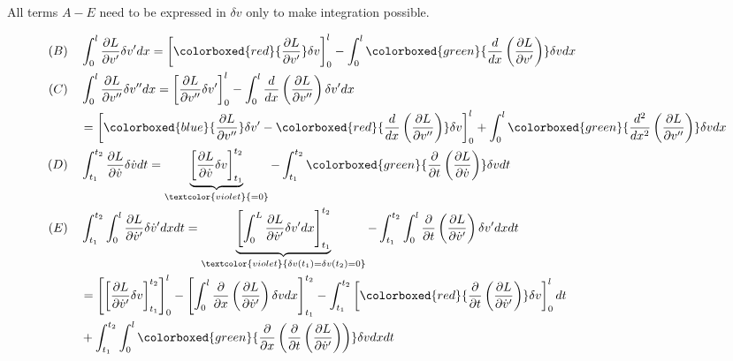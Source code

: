 \documentclass[10pt,a4paper]{scrartcl}
\begin{document}
\begin{multicols*}{2}
All terms $A-E$ need to be expressed in $\delta v$ only to make integration possible.

\begin{align*}
(B)\quad&\int_0^l\frac{\partial L}{\partial v'}\delta v' dx = \left[\colorboxed{red}{\frac{\partial L}{\partial v'}}\delta v\right]_0^l-\int_0^l\colorboxed{green}{\frac{d}{dx}\left(\frac{\partial L}{\partial v'}\right)}\delta v dx\\
(C)\quad&\int_0^l\frac{\partial L}{\partial v''}\delta v''dx = \left[\frac{\partial L}{\partial v''}\delta v'\right]_0^l-\int_0^l\frac{d}{dx}\left(\frac{\partial L}{\partial v''}\right)\delta v' dx\\
&=\left[\colorboxed{blue}{\frac{\partial L}{\partial v''}}\delta v'-\colorboxed{red}{\frac{d}{dx}\left(\frac{\partial L}{\partial v''}\right)}\delta v\right]_0^l+\int_0^l\colorboxed{green}{\frac{d^2}{dx^2}\left(\frac{\partial L}{\partial v''}\right)}\delta v dx\\
(D)\quad&\int_{t_1}^{t_2}\frac{\partial L}{\partial \dot{v}}\delta\dot{v} dt=\underbrace{\left[\frac{\partial L}{\partial\dot{v}}\delta v\right]_{t_1}^{t_2}}_{\textcolor{violet}{=0}}-\int_{t_1}^{t_2}\colorboxed{green}{\frac{\partial }{\partial t}\left(\frac{\partial L}{\partial \dot{v}}\right)}\delta v d t\\
(E)\quad&\int_{t_1}^{t_2}\int_0^l\frac{\partial L}{\partial \dot{v}'}\delta \dot{v}'dx dt = \underbrace{\left[\int_0^L\frac{\partial L}{\partial\dot{v}'}\delta v' dx\right]_{t_1}^{t_2}}_{\textcolor{violet}{\tiny \delta v(t_1)=\delta v(t_2) = 0}}-\int_{t_1}^{t_2}\int_0^l\frac{\partial}{\partial t}\left(\frac{\partial L}{\partial \dot{v}'}\right)\delta v' dx dt \\
&=\left[\left[\frac{\partial L}{\partial \dot{v}'}\delta v\right]_{t_1}^{t_2}\right]_0^l-\left[\int_0^l\frac{\partial}{\partial x}\left(\frac{\partial L}{\partial \dot{v}'}\right)\delta v dx\right]_{t_1}^{t_2}-\int_{t_1}^{t_2}\left[\colorboxed{red}{\frac{\partial}{\partial t}\left(\frac{\partial L}{\partial\dot{v}'}\right)}\delta v\right]_0^ldt\\
&+\int_{t_1}^{t_2}\int_0^l\colorboxed{green}{\frac{\partial}{\partial x}\left(\frac{\partial}{\partial t}\left(\frac{\partial L}{\partial\dot{v}'}\right)\right)}\delta v dx dt
\end{align*}



\end{multicols*}
\end{document}
